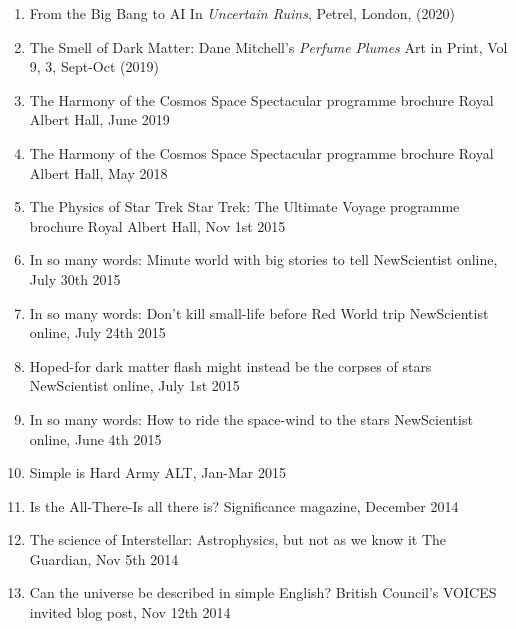 \begin{enumerate}
\item
{}
{From the Big Bang to AI} 
{In {\em Uncertain Ruins}, Petrel, London, (2020)} 

\item 
{}
{The Smell of Dark Matter: Dane Mitchell's {\em Perfume Plumes}}
{Art in Print, Vol 9, 3, Sept-Oct (2019)}  

\item
{}
{The Harmony of the Cosmos}
{Space Spectacular programme brochure}
{Royal Albert Hall, June 2019}

\item 
{}
{The Harmony of the Cosmos}
{Space Spectacular programme brochure}
{Royal Albert Hall, May  2018}


\item
{}
{The Physics of Star Trek}
{Star Trek: The Ultimate Voyage programme brochure}
{Royal Albert Hall, Nov 1st 2015}

\item
{}
{In so many words: Minute world with big stories to tell}
{NewScientist online, July 30th 2015}

\item 
{}
{In so many words: Don't kill small-life before Red World trip}
{NewScientist online, July 24th 2015}

\item
{}
{Hoped-for dark matter flash might instead be the corpses of stars}
{NewScientist online, July 1st 2015}

\item
{}
{In so many words: How to ride the space-wind to the stars}
{NewScientist online, June 4th 2015}

\item {}
{Simple is Hard}
{Army ALT, Jan-Mar 2015}

\item 
{}
{Is the All-There-Is all there is?}
{Significance magazine, December 2014}


\item
{}
{The science of Interstellar: Astrophysics, but not as we know it}
{The Guardian, Nov 5th 2014}

\item
{}
{Can the universe be described in simple English?}
{British Council's VOICES invited blog post, Nov 12th 2014}


\end{enumerate}
